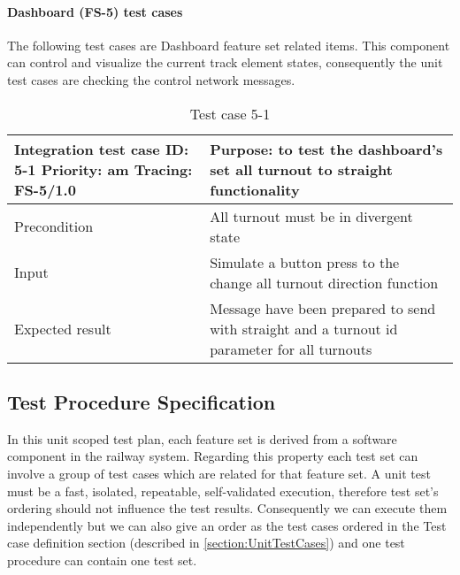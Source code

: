 \paragraph{Dashboard (FS-5) test cases} The following test cases are Dashboard feature set related items. This component can control and visualize the current track element states, consequently the unit test cases are checking the control network messages.
\begin{table}[H]
	\caption{Test case 5-1}
	\label{table:TCase-FS5-01}
	\begin{center}
		\renewcommand{\arraystretch}{1.8}
		\begin{tabu} 
			to 0.9 \textwidth
			{  X[0.4, c] X[c] }
			\toprule
			Integration test case ID: 5-1 \newline Priority: am \newline Tracing: FS-5/1.0 & Purpose: to test the dashboard's set all turnout to straight functionality                   \\ \midrule
			Precondition                                                                   & All turnout must be in divergent state                                                       \\
			Input                                                                          & Simulate a button press to the change all turnout direction function                         \\
			Expected result                                                                & Message have been prepared to send with straight and a turnout id parameter for all turnouts \\ \bottomrule
		\end{tabu}
	\end{center}
\end{table}





\noindent\subsection{Test Procedure Specification}
In this unit scoped test plan, each feature set is derived from a software component in the railway system. Regarding this property each test set can involve a group of test cases which are related for that feature set. A unit test must be a fast, isolated, repeatable, self-validated execution, therefore test set's ordering should not influence the test results. Consequently we can execute them independently but we can also give an order as the test cases ordered in the Test case definition section (described in \autoref{section:UnitTestCases}) and one test procedure can contain one test set. 

